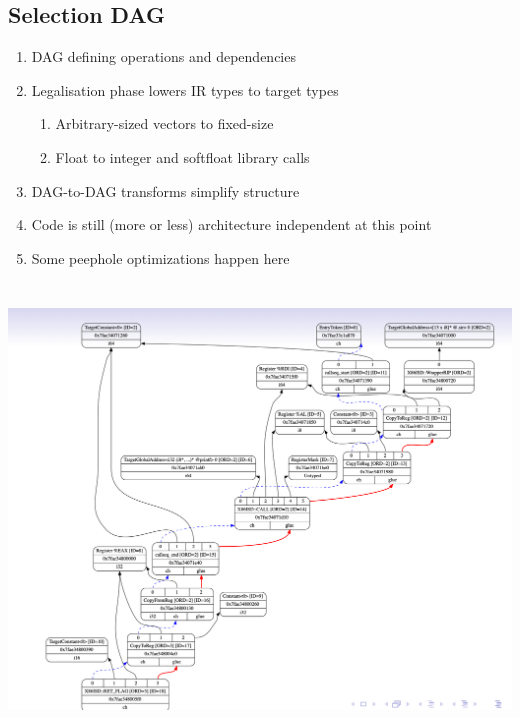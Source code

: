 \documentclass[a4paper]{exam}
\theoremstyle{definition}
\begin{document}
\subsection{Selection DAG}
\begin{enumerate}
  \item DAG defining operations and dependencies
  \item Legalisation phase lowers IR types to target types
        \begin{enumerate}
          \item Arbitrary-sized vectors to fixed-size
          \item Float to integer and softfloat library calls
        \end{enumerate}

  \item DAG-to-DAG transforms simplify structure
  \item Code is still (more or less) architecture independent at this
        point
  \item Some peephole optimizations happen here
\end{enumerate}

\begin{center}
  \includegraphics[height=12cm]{img/Snipaste_2021-04-05_17-45-22.png}
\end{center}
\end{document}
